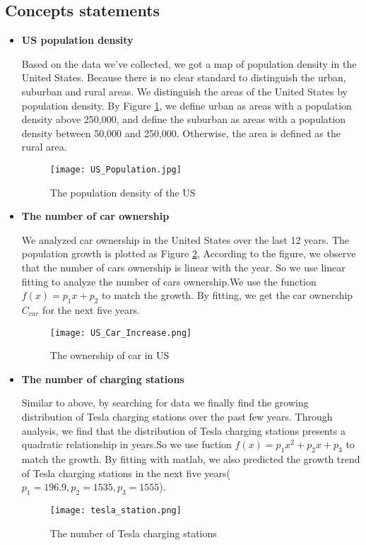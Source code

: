 \documentclass[12pt]{article}  %
\begin{document}
\subsection{Concepts statements}
\begin{itemize}
	\item \textbf{US population density}
		
Based on the data we've collected, we got a map of population density in the United States. Because there is no clear standard to distinguish the urban, suburban and rural areas. We distinguish the areas of the United States by population density. By Figure \ref{fig:1}, we define urban as areas with a population density above 250,000, and define the suburban as areas with a population density between 50,000 and 250,000. Otherwise, the area is defined as the rural area.
\begin{figure}[H]
	\centering
	\texttt{[image: US\_Population.jpg]}
	\caption{The population density of the US}\label{fig:1}
\end{figure}	

	\item \textbf{The number of car ownership}
	
We analyzed car ownership in the United States over the last 12 years. The population growth is plotted as Figure \ref{fig:2}, According to the figure, we observe that the number of cars ownership is linear with the year. So we use linear fitting to analyze the number of cars ownership.We use the function
$f(x) = {p_1}x + {p_2}$ to match the growth. By fitting, we get the car ownership ${C_{car}}$ for the next five years.
\begin{figure}[H]
	\centering
	\texttt{[image: US\_Car\_Increase.png]}
	\caption{The ownership of car in US}\label{fig:2}
\end{figure}

	\item \textbf{The number of charging stations}
	
Similar to above, by searching for data we finally find the growing distribution of Tesla charging stations over the past few years. Through analysis, we find that the distribution of Tesla charging stations presents a quadratic relationship in years.So we use fuction $f(x) = {p_1}{x^2} + {p_2}x + {p_3}$ to match the growth. By fitting with matlab, we also predicted the growth trend of Tesla charging stations in the next five years(${p_1=196.9, p_2=1535, p_3=1555}$).
\begin{figure}[H]
	\centering
	\texttt{[image: tesla\_station.png]}
	\caption{The number of Tesla charging stations}\label{fig:3}
\end{figure}

\end{itemize}
\end{document}
